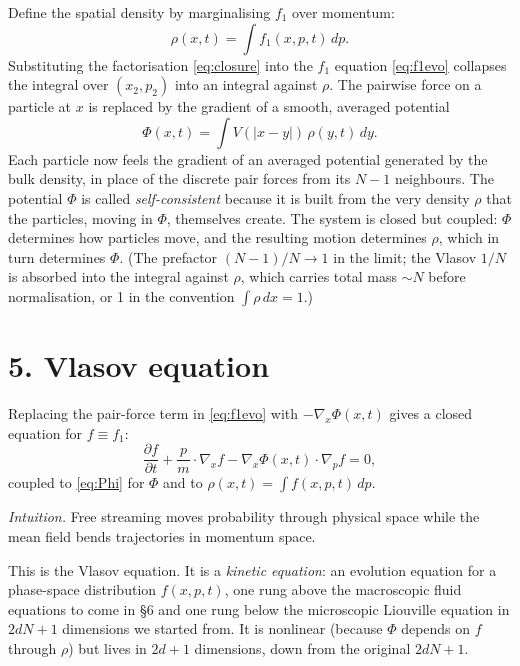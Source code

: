 \documentclass{article}
\begin{document}
Define the spatial density by marginalising \(f_1\) over momentum:
\[
\rho(x, t) = \int f_1(x, p, t)\, dp.
\]
Substituting the factorisation \eqref{eq:closure} into the \(f_1\) equation \eqref{eq:f1evo} collapses the integral over \((x_2, p_2)\) into an integral against \(\rho\). The pairwise force on a particle at \(x\) is replaced by the gradient of a smooth, averaged potential
\begin{equation}
\Phi(x, t) = \int V(|x - y|)\, \rho(y, t)\, dy.
\label{eq:Phi}
\end{equation}
Each particle now feels the gradient of an averaged potential generated by the bulk density, in place of the discrete pair forces from its \(N-1\) neighbours. The potential \(\Phi\) is called \emph{self-consistent} because it is built from the very density \(\rho\) that the particles, moving in \(\Phi\), themselves create. The system is closed but coupled: \(\Phi\) determines how particles move, and the resulting motion determines \(\rho\), which in turn determines \(\Phi\). (The prefactor \((N-1)/N \to 1\) in the limit; the Vlasov \(1/N\) is absorbed into the integral against \(\rho\), which carries total mass \(\sim N\) before normalisation, or 1 in the convention \(\int \rho\, dx = 1\).)

\section*{5. Vlasov equation}

Replacing the pair-force term in \eqref{eq:f1evo} with \(-\nabla_x \Phi(x,t)\) gives a closed equation for \(f \equiv f_1\):
\begin{equation}
\boxed{\;\frac{\partial f}{\partial t} + \frac{p}{m} \cdot \nabla_x f - \nabla_x \Phi(x, t) \cdot \nabla_p f = 0,\;}
\label{eq:vlasov}
\end{equation}
coupled to \eqref{eq:Phi} for \(\Phi\) and to \(\rho(x,t) = \int f(x,p,t)\, dp\).

\noindent\emph{Intuition.} Free streaming moves probability through physical space while the mean field bends trajectories in momentum space.

This is the Vlasov equation. It is a \emph{kinetic equation}: an evolution equation for a phase-space distribution \(f(x, p, t)\), one rung above the macroscopic fluid equations to come in \S 6 and one rung below the microscopic Liouville equation in \(2dN+1\) dimensions we started from. It is nonlinear (because \(\Phi\) depends on \(f\) through \(\rho\)) but lives in \(2d+1\) dimensions, down from the original \(2dN+1\).
\end{document}
